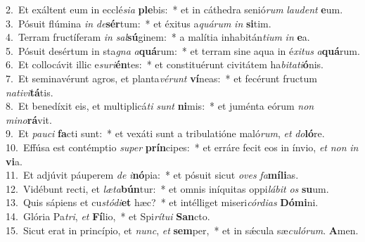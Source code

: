 {2.~}Et exáltent eum in ecclé\textit{si}\textit{a} \textbf{ple}bis:~* et in cáthedra senió\textit{rum} \textit{lau}\textit{dent} \textbf{e}um.\\
{3.~}Pósuit flúmina \textit{in} \textit{de}\textbf{sér}tum:~* et éxitus a\textit{quá}\textit{rum} \textit{in} \textbf{si}tim.\\
{4.~}Terram fructíferam \textit{in} \textit{sal}\textbf{sú}ginem:~* a malítia inhabitán\textit{ti}\textit{um} \textit{in} \textbf{e}a.\\
{5.~}Pósuit desértum in sta\textit{gna} \textit{a}\textbf{quá}rum:~* et terram sine aqua in é\textit{xi}\textit{tus} \textit{a}\textbf{quá}rum.\\
{6.~}Et collocávit illic e\textit{su}\textit{ri}\textbf{én}tes:~* et constituérunt civitátem ha\textit{bi}\textit{ta}\textit{ti}\textbf{ó}nis.\\
{7.~}Et seminavérunt agros, et planta\textit{vé}\textit{runt} \textbf{ví}neas:~* et fecérunt fructum \textit{na}\textit{ti}\textit{vi}\textbf{tá}tis.\\
{8.~}Et benedíxit eis, et multiplicá\textit{ti} \textit{sunt} \textbf{ni}mis:~* et juménta eórum \textit{non} \textit{mi}\textit{no}\textbf{rá}vit.\\
{9.~}Et \textit{pau}\textit{ci} \textbf{fa}cti sunt:~* et vexáti sunt a tribulatióne maló\textit{rum}, \textit{et} \textit{do}\textbf{ló}re.\\
{10.~}Effúsa est contémptio \textit{su}\textit{per} \textbf{prín}cipes:~* et erráre fecit eos in ínvio, \textit{et} \textit{non} \textit{in} \textbf{vi}a.\\
{11.~}Et adjúvit páuperem \textit{de} \textit{i}\textbf{nó}pia:~* et pósuit sicut \textit{o}\textit{ves} \textit{fa}\textbf{mí}\textbf{li}as.\\
{12.~}Vidébunt recti, et \textit{læ}\textit{ta}\textbf{bún}tur:~* et omnis iníquitas oppi\textit{lá}\textit{bit} \textit{os} \textbf{su}um.\\
{13.~}Quis sápiens et cu\textit{stó}\textit{di}\textbf{et} hæc?~* et intélliget miseri\textit{cór}\textit{di}\textit{as} \textbf{Dó}\textbf{mi}ni.\\
{14.~}Glória Pa\textit{tri}, \textit{et} \textbf{Fí}lio,~* et Spi\textit{rí}\textit{tu}\textit{i} \textbf{San}cto.\\
{15.~}Sicut erat in princípio, et \textit{nunc}, \textit{et} \textbf{sem}per,~* et in sǽcula sæ\textit{cu}\textit{ló}\textit{rum}. \textbf{A}men.\\
